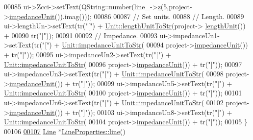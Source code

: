 \begin{DoxyCode}
00085   ui->Zcci->setText(QString::number(line\_->\hyperlink{group___models_gab5370574fd93e13eb11742f7753fe1f1}{z}(5,project->\hyperlink{class_project_ad0725b9aa4445dd6d21d4e15df482d3b}{impedanceUnit}()).imag()));
00086 
00087   \textcolor{comment}{// Set units.}
00088   \textcolor{comment}{// Length.}
00089   ui->lengthUn->setText(tr(\textcolor{stringliteral}{"["}) + \hyperlink{class_unit_abd363319f79f97b0a0b9a08c5ddc3cdb}{Unit::lengthUnitToStr}(project->
      \hyperlink{class_project_a40cd2f59a4a708897e5997942c046f4d}{lengthUnit}()) +
00090                         tr(\textcolor{stringliteral}{"]"}));
00091 
00092   \textcolor{comment}{// Impedance.}
00093   ui->impedanceUn1->setText(tr(\textcolor{stringliteral}{"["}) + \hyperlink{class_unit_ae3ca20f4b6530f04ca6aa138ec0fa7d2}{Unit::impedanceUnitToStr}(
00094                               project->\hyperlink{class_project_ad0725b9aa4445dd6d21d4e15df482d3b}{impedanceUnit}()) + tr(\textcolor{stringliteral}{"]"}));
00095   ui->impedanceUn2->setText(tr(\textcolor{stringliteral}{"["}) + \hyperlink{class_unit_ae3ca20f4b6530f04ca6aa138ec0fa7d2}{Unit::impedanceUnitToStr}(
00096                               project->\hyperlink{class_project_ad0725b9aa4445dd6d21d4e15df482d3b}{impedanceUnit}()) + tr(\textcolor{stringliteral}{"]"}));
00097   ui->impedanceUn3->setText(tr(\textcolor{stringliteral}{"["}) + \hyperlink{class_unit_ae3ca20f4b6530f04ca6aa138ec0fa7d2}{Unit::impedanceUnitToStr}(
00098                               project->\hyperlink{class_project_ad0725b9aa4445dd6d21d4e15df482d3b}{impedanceUnit}()) + tr(\textcolor{stringliteral}{"]"}));
00099   ui->impedanceUn5->setText(tr(\textcolor{stringliteral}{"["}) + \hyperlink{class_unit_ae3ca20f4b6530f04ca6aa138ec0fa7d2}{Unit::impedanceUnitToStr}(
00100                               project->\hyperlink{class_project_ad0725b9aa4445dd6d21d4e15df482d3b}{impedanceUnit}()) + tr(\textcolor{stringliteral}{"]"}));
00101   ui->impedanceUn6->setText(tr(\textcolor{stringliteral}{"["}) + \hyperlink{class_unit_ae3ca20f4b6530f04ca6aa138ec0fa7d2}{Unit::impedanceUnitToStr}(
00102                               project->\hyperlink{class_project_ad0725b9aa4445dd6d21d4e15df482d3b}{impedanceUnit}()) + tr(\textcolor{stringliteral}{"]"}));
00103   ui->impedanceUn8->setText(tr(\textcolor{stringliteral}{"["}) + \hyperlink{class_unit_ae3ca20f4b6530f04ca6aa138ec0fa7d2}{Unit::impedanceUnitToStr}(
00104                               project->\hyperlink{class_project_ad0725b9aa4445dd6d21d4e15df482d3b}{impedanceUnit}()) + tr(\textcolor{stringliteral}{"]"}));
00105 \}
00106 
\hypertarget{lineproperties_8cpp_source_l00107}{}\hyperlink{class_line_properties_ae99691d680b4df7bac3419b5588bd777}{00107} \hyperlink{class_line}{Line} *\hyperlink{class_line_properties_ae99691d680b4df7bac3419b5588bd777}{LineProperties::line}()

\end{DoxyCode}
